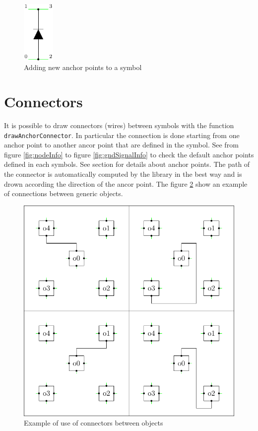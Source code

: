 \documentclass[a4paper,12pt]{report}
\begin{document}
\begin{figure}[ht]
  \centering
  \includegraphics[width=0.14\textwidth]{anchorExample3.pdf}
  \caption{Adding new anchor points to a symbol}
  \label{fig:anchorExample3}
\end{figure}

\clearpage
\section*{Connectors}
\label{sct:connector}

It is possible to draw connectors (wires) between symbols with the function \texttt{drawAnchorConnector}. In particular the connection is done starting from one anchor point to another ancor point that are defined in the symbol. See from figure \ref{fig:nodeInfo} to figure \ref{fig:gndSignalInfo} to check the default anchor points defined in each symbols. See section  for details about anchor points. The path of the connector is automatically computed by the library in the best way and is drown according the direction of the ancor point. The figure \ref{fig:connectorExample} show an example of connections between generic objects.

\begin{figure}[ht]
  \centering
  \includegraphics[width=1.0\textwidth]{N-S}
  \caption{Example of use of connectors between objects}
  \label{fig:connectorExample}
\end{figure}
\end{document}
